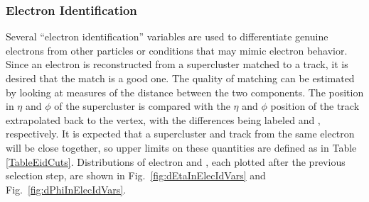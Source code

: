 

\subsubsection{Electron Identification}
\label{evSel:eid}
Several ``electron identification'' variables are used to differentiate genuine electrons  %
from other particles or conditions that may mimic electron behavior.  
Since an electron is reconstructed from a supercluster matched to a track, it is desired that the match is a good one.
The quality of matching can be estimated by looking at measures of the distance between the two components.
The position in $ \eta $ and $ \phi $ of the supercluster is compared with 
the $ \eta $ and $ \phi $ position of the track extrapolated back to the vertex, 
with the differences being labeled \detain and \dphiin, respectively.  
It is expected that a supercluster and track from the same electron will be close together, 
so upper limits on these quantities are defined as in Table \ref{TableEidCuts}.  
Distributions of electron \detain and \dphiin, 
each plotted after the previous selection step,%
are shown in Fig.~\ref{fig:dEtaInElecIdVars} and 
Fig.~\ref{fig:dPhiInElecIdVars}.  

